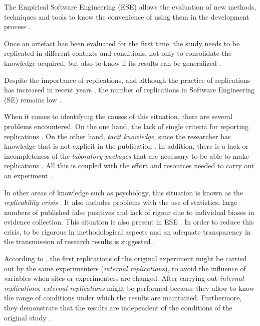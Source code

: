 
The Empirical Software Engineering (ESE) allows the evaluation of new methods, techniques and tools to know the convenience of using them in the development process  \cite{sjoberg2005survey}.

Once an artefact has been evaluated for the first time, the study needs to be replicated in different contexts and conditions, not only to consolidate the knowledge acquired, but also to know if its results can be generalized \cite{Baldassarre}.

Despite the importance of replications, and although the practice of replications has increased in recent years  \cite{da2014replication}, the number of replications in Software Engineering (SE) remains low  \cite{solari2017content}.

When it comes to identifying the causes of this situation, there are several problems encountered. On the one hand, the lack of single criteria for reporting replications \cite{carver2010towards}. On the other hand, \emph{tacit knowledge}, since the researcher has knowledge that is not explicit in the publication \cite{shull2002replicating}. In addition, there is a lack or incompleteness of the \emph{laboratory packages} that are necessary to be able to make replications \cite{solari2017content}. All this is coupled with the effort and resources needed to carry out an experiment \cite{da2014replication}.

In other areas of knowledge such as psychology, this situation is known as the \emph{replicability crisis} \cite{blanco2017psicologia}. It also includes problems with the use of statistics, large numbers of published false positives and lack of rigour due to individual biases in evidence collection. This situation is also present in ESE \cite{reyes2018statistical} . In order to reduce this crisis, to be rigorous in methodological aspects and an adequate transparency in the transmission of research results is suggested \cite{blanco2017psicologia}. %

According to \cite{gomez2010replications}, the first replications of the original experiment might be carried out by the same experimenters (\emph{internal replications}), to avoid the influence of variables when sites or experimenters are changed. After carrying out \emph{internal replications}, \emph{external replications} might be performed because they allow to know the range of conditions under which the results are maintained. Furthermore, they demonstrate that the results are independent of the conditions of the original study \cite{brooks1996replication,shull2008role}.


